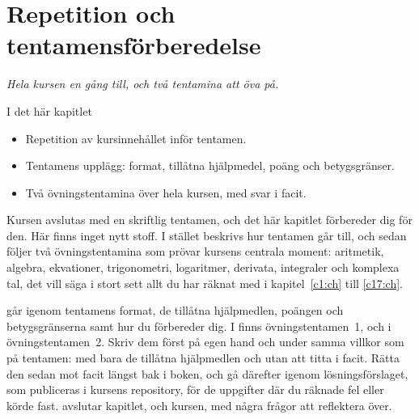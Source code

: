 
\chapter{Repetition och tentamensförberedelse}
\label{c19:ch}

{\large\itshape Hela kursen en gång till, och två tentamina att öva på.\par}

\begin{chapterbox}{I det här kapitlet}
\begin{itemize}
  \item Repetition av kursinnehållet inför tentamen.
  \item Tentamens upplägg: format, tillåtna hjälpmedel, poäng och betygsgränser.
  \item Två övningstentamina över hela kursen, med svar i facit.
\end{itemize}
\end{chapterbox}

Kursen avslutas med en skriftlig tentamen, och det här kapitlet förbereder dig för den. Här
finns inget nytt stoff. I stället beskrivs hur tentamen går till, och sedan följer två
övningstentamina som prövar kursens centrala moment: aritmetik, algebra, ekvationer,
trigonometri, logaritmer, derivata, integraler och komplexa tal, det vill säga i stort sett allt
du har räknat med i kapitel~\ref{c1:ch} till \ref{c17:ch}.

 går igenom tentamens format, de tillåtna hjälpmedlen, poängen och
betygsgränserna samt hur du förbereder dig. I  finns
övningstentamen~1, och i  övningstentamen~2. Skriv dem först på egen hand och under samma villkor som på tentamen: med bara
de tillåtna hjälpmedlen och utan att titta i facit. Rätta den sedan mot facit längst bak i boken,
och gå därefter igenom lösningsförslaget, som publiceras i kursens repository, för de uppgifter
där du räknade fel eller körde fast.  avslutar kapitlet, och
kursen, med några frågor att reflektera över.





